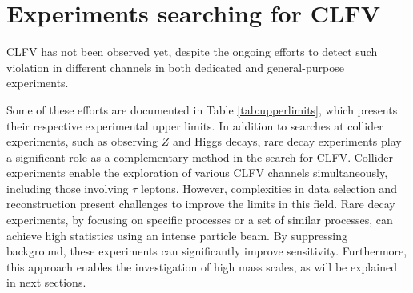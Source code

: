 \section{Experiments searching for CLFV}
CLFV has not been observed yet, despite the ongoing efforts to 
detect such violation in different channels in both dedicated and general-purpose experiments.

Some of these efforts are documented in Table \ref{tab:upperlimits}, which 
presents their respective experimental upper limits. 
In addition to searches at collider experiments, such as observing $Z$ and 
Higgs decays, rare decay experiments play a significant role as a complementary method in the search for CLFV. 
Collider experiments enable the exploration of various CLFV channels simultaneously, 
including those involving $\tau$ leptons. 
However, complexities in data selection and reconstruction 
present challenges to improve the limits in this field.
Rare decay experiments, by focusing on specific processes or a 
set of similar processes, can achieve high statistics using an intense particle beam. 
By suppressing background, these experiments can 
significantly improve  sensitivity. Furthermore, this approach 
enables the investigation of high mass scales, as will be explained in next sections.

